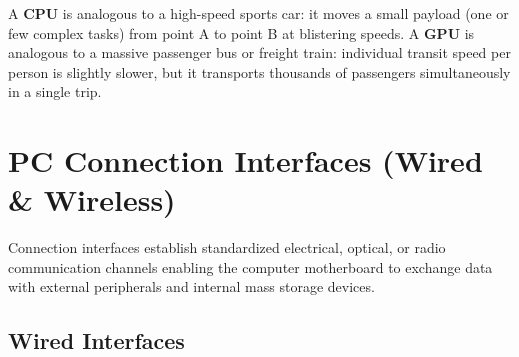 \begin{keyequation}
A \textbf{CPU} is analogous to a high-speed sports car: it moves a small payload (one or few complex tasks) from point A to point B at blistering speeds. A \textbf{GPU} is analogous to a massive passenger bus or freight train: individual transit speed per person is slightly slower, but it transports thousands of passengers simultaneously in a single trip.
\end{keyequation}

\section{PC Connection Interfaces (Wired \& Wireless)}

Connection interfaces establish standardized electrical, optical, or radio communication channels enabling the computer motherboard to exchange data with external peripherals and internal mass storage devices.

\subsection{Wired Interfaces}

